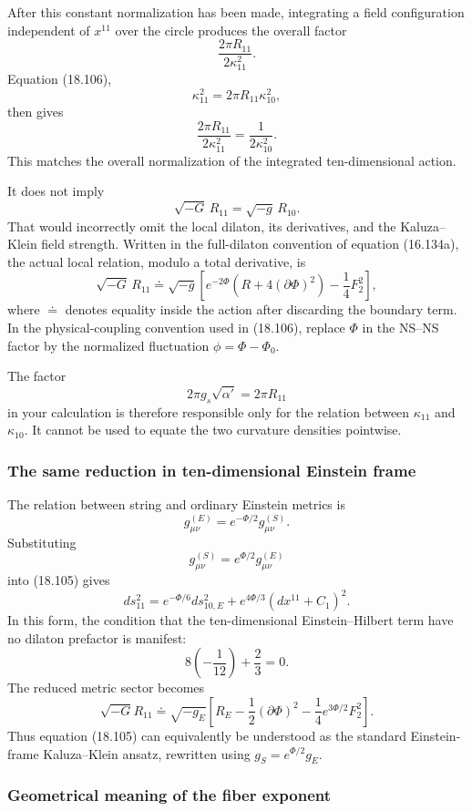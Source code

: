 \documentclass[
  10pt,
  a4paper,
  openany]{book}
\begin{document}
After this constant normalization has been made, integrating a field
configuration independent of \(x^{11}\) over the circle produces the
overall factor \[
\frac{2\pi R_{11}}{2\kappa_{11}^2}.
\] Equation (18.106), \[
\boxed{
\kappa_{11}^2
=2\pi R_{11}\kappa_{10}^2
},
\] then gives \[
\frac{2\pi R_{11}}{2\kappa_{11}^2}
=\frac1{2\kappa_{10}^2}.
\] This matches the overall normalization of the integrated
ten-dimensional action.

It does not imply \[
\sqrt{-G}\,R_{11}
=\sqrt{-g}\,R_{10}.
\] That would incorrectly omit the local dilaton, its derivatives, and
the Kaluza--Klein field strength. Written in the full-dilaton convention
of equation (16.134a), the actual local relation, modulo a total
derivative, is \[
\boxed{
\sqrt{-G}\,R_{11}
\doteq
\sqrt{-g}
\left[
e^{-2\Phi}
\left(R+4(\partial\Phi)^2\right)
-\frac14F_2^2
\right]
},
\] where \(\doteq\) denotes equality inside the action after discarding
the boundary term. In the physical-coupling convention used in (18.106),
replace \(\Phi\) in the NS--NS factor by the normalized fluctuation
\(\phi=\Phi-\Phi_0\).

The factor \[
2\pi g_s\sqrt{\alpha'}
=2\pi R_{11}
\] in your calculation is therefore responsible only for the relation
between \(\kappa_{11}\) and \(\kappa_{10}\). It cannot be used to equate
the two curvature densities pointwise.

\subsubsection{The same reduction in ten-dimensional Einstein
frame}\label{the-same-reduction-in-ten-dimensional-einstein-frame}

The relation between string and ordinary Einstein metrics is \[
g_{\mu\nu}^{(E)}
=e^{-\Phi/2}g_{\mu\nu}^{(S)}.
\] Substituting \[
g_{\mu\nu}^{(S)}
=e^{\Phi/2}g_{\mu\nu}^{(E)}
\] into (18.105) gives \[
\boxed{
ds_{11}^2
=e^{-\Phi/6}ds_{10,E}^2
+e^{4\Phi/3}(dx^{11}+C_1)^2
}.
\] In this form, the condition that the ten-dimensional
Einstein--Hilbert term have no dilaton prefactor is manifest: \[
8\left(-\frac1{12}\right)+\frac23=0.
\] The reduced metric sector becomes \[
\boxed{
\sqrt{-G}R_{11}
\doteq
\sqrt{-g_E}
\left[
R_E
-\frac12(\partial\Phi)^2
-\frac14e^{3\Phi/2}F_2^2
\right]
}.
\] Thus equation (18.105) can equivalently be understood as the standard
Einstein-frame Kaluza--Klein ansatz, rewritten using
\(g_S=e^{\Phi/2}g_E\).

\subsubsection{Geometrical meaning of the fiber
exponent}\label{geometrical-meaning-of-the-fiber-exponent}
\end{document}
